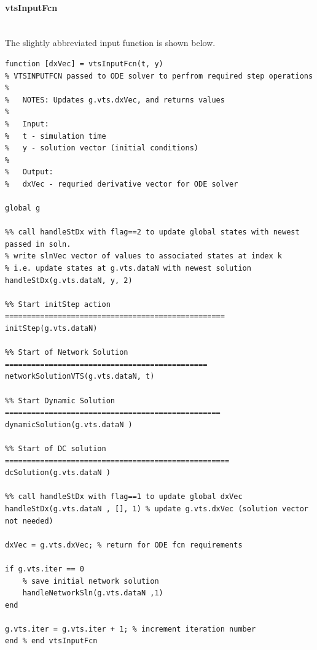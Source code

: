 \documentclass[12pt]{article}
\begin{document}
\pagebreak
\paragraph{vtsInputFcn} \ \\
The slightly abbreviated input function is shown below.
\begin{verbatim}
function [dxVec] = vtsInputFcn(t, y)
% VTSINPUTFCN passed to ODE solver to perfrom required step operations
%
%   NOTES: Updates g.vts.dxVec, and returns values
%
%   Input:
%   t - simulation time
%   y - solution vector (initial conditions)
%
%   Output:
%   dxVec - requried derivative vector for ODE solver

global g

%% call handleStDx with flag==2 to update global states with newest passed in soln.
% write slnVec vector of values to associated states at index k
% i.e. update states at g.vts.dataN with newest solution
handleStDx(g.vts.dataN, y, 2)

%% Start initStep action ==================================================
initStep(g.vts.dataN)

%% Start of Network Solution ==============================================
networkSolutionVTS(g.vts.dataN, t)

%% Start Dynamic Solution =================================================
dynamicSolution(g.vts.dataN )

%% Start of DC solution ===================================================
dcSolution(g.vts.dataN )

%% call handleStDx with flag==1 to update global dxVec
handleStDx(g.vts.dataN , [], 1) % update g.vts.dxVec (solution vector not needed)

dxVec = g.vts.dxVec; % return for ODE fcn requirements

if g.vts.iter == 0
    % save initial network solution
    handleNetworkSln(g.vts.dataN ,1)
end

g.vts.iter = g.vts.iter + 1; % increment iteration number
end % end vtsInputFcn
\end{verbatim}

\pagebreak
\end{document}
